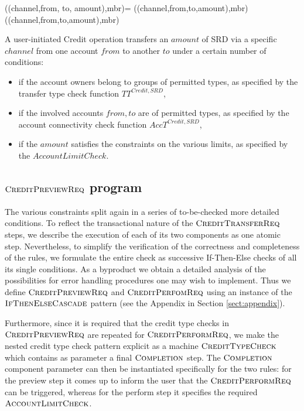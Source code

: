 \begin{asm}
((channel,from, to, amount),mbr)=\+
   ((channel,from,to,amount),mbr)  \\
   ((channel,from,to,amount),mbr) 
\end{asm}


A user-initiated Credit operation transfers an $amount$ of SRD via a specific $channel$ from one account $from$ to another $to$ under a certain number of conditions:

\begin{itemize}
	\item if the account owners belong to groups of permitted types, as specified by the transfer type check function $TT^{Credit,SRD}$, 
	\item if the involved accounts $from,to$ are of permitted types, as specified by  the account connectivity check function $AccT^{Credit,SRD}$, 
	\item if the $amount$ satisfies the constraints on the various limits, as specified by the $AccountLimitCheck$.
\end{itemize}


\subsection{$\hbox{\sc CreditPreviewReq}$ program}
\label{sect:creditpreview}

The various constraints split again in a series of to-be-checked  more detailed conditions. To reflect the transactional nature of the $\hbox{\sc CreditTransferReq}$ steps, we describe the execution of each of its two components as one atomic step. Nevertheless, to simplify the verification of the correctness and completeness of the rules, we formulate the entire check as successive If-Then-Else checks of all its single conditions. As a byproduct we obtain a detailed analysis of the possibilities for error handling procedures one may wish to implement. Thus we define  $\hbox{\sc CreditPreviewReq}$ and $\hbox{\sc CreditPerfomReq}$ using an instance of the $\hbox{\sc IfThenElseCascade}$ pattern (see the Appendix in Section \ref{sect:appendix}). 

Furthermore, since it is required that the credit type checks in $\hbox{\sc CreditPreviewReq}$ are repeated for $\hbox{\sc CreditPerformReq}$, we make the nested credit type check pattern explicit as a machine $\hbox{\sc CreditTypeCheck}$ which contains as parameter a final $\hbox{\sc Completion}$ step. The $\hbox{\sc Completion}$ component parameter can then be instantiated specifically for the two rules: for the preview step it comes up to inform the user that the $\hbox{\sc CreditPerformReq}$ can be triggered, whereas for the perform step it specifies the required $\hbox{\sc AccountLimitCheck}$. 


